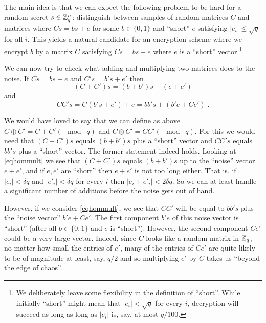 The main idea is that we can expect the following problem to be hard for
a random secret \(s\in{\mathbb{Z}}_q^n\): distinguish between samples of random
matrices \(C\) and matrices where \(Cs = bs + e\) for some
\(b\in\{0,1\}\) and ``short'' \(e\) satisfying \(|e_i| \leq \sqrt{q}\)
for all \(i\). This yields a natural candidate for an encryption scheme
where we encrypt \(b\) by a matrix \(C\) satisfying \(Cs = bs + e\)
where \(e\) is a ``short'' vector.\footnote{We deliberately leave some
  flexibility in the definition of ``short''. While initially ``short''
  might mean that \(|e_i|<\sqrt{q}\) for every \(i\), decryption will
  succeed as long as long as \(|e_i|\) is, say, at most \(q/100\).}

We can now try to check what adding and multiplying two matrices does to
the noise. If \(Cs = bs+e\) and \(C's=b's+e'\) then
\[(C+C')s = (b+b')s+(e+e') \label{eqhomadd}\] and
\[\ensuremath{\mathit{CC}}'s = C(b's+e')+e =bb's+ (b'e+Ce')\;. \label{eqhommult} \]


We would have loved to say that we can define as above
\(C\oplus C' = C+C' (\mod\; q)\) and
\(C\otimes C' = \ensuremath{\mathit{CC}}' (\mod \; q)\). For this we
would need that \((C+C')s\) equals \((b+b')s\) plus a ``short'' vector
and \(\ensuremath{\mathit{CC}}'s\) equals \(bb's\) plus a ``short''
vector. The former statement indeed holds. Looking at \eqref{eqhommult}
we see that \((C+C')s\) equals \((b+b')s\) up to the ``noise'' vector
\(e+e'\), and if \(e,e'\) are ``short'' then \(e+e'\) is not too long
either. That is, if \(|e_i|<\delta q\) and \(|e'_i|<\delta q\) for every
\(i\) then \(|e_i+e'_i|<2\delta q\). So we can at least handle a
significant number of additions before the noise gets out of hand.

However, if we consider \eqref{eqhommult}, we see that
\(\ensuremath{\mathit{CC}}'\) will be equal to \(bb's\) plus the ``noise
vector'' \(b'e + Ce'\). The first component \(b'e\) of this noise vector
is ``short'' (after all \(b\in \{0,1\}\) and \(e\) is ``short'').
However, the second component \(Ce'\) could be a very large vector.
Indeed, since \(C\) looks like a random matrix in \({\mathbb{Z}}_q\), no matter
how small the entries of \(e'\), many of the entries of \(Ce'\) are
quite likely to be of magnitude at least, say, \(q/2\) and so
multiplying \(e'\) by \(C\) takes us ``beyond the edge of chaos''.

